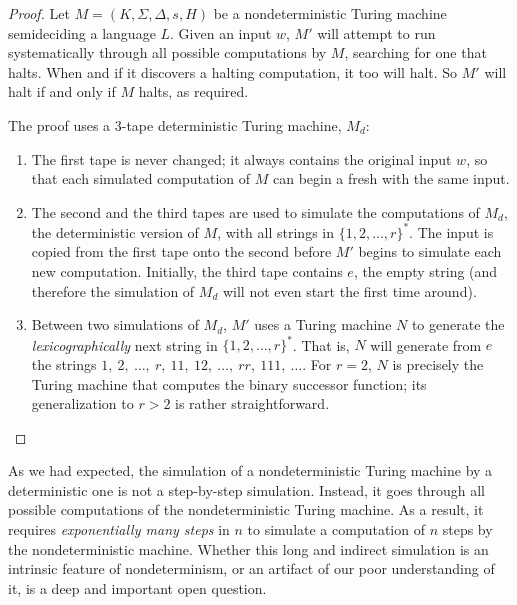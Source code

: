 \begin{proof}
Let $M = (K, \Sigma, \Delta, s, H)$ be a nondeterministic Turing machine semideciding a language $L$. Given an input $w$, $M'$ will attempt to run systematically through all possible computations by $M$, searching for one that halts. When and if it discovers a halting computation, it too will halt. So $M'$ will halt if and only if $M$ halts, as required.

The proof uses a 3-tape deterministic Turing machine, $M_d$:
\begin{enumerate}
  \item The first tape is never changed; it always contains the original input $w$, so that each simulated computation of $M$ can begin a fresh with the same input.
  \item The second and the third tapes are used to simulate the computations of $M_d$, the deterministic version of $M$, with all strings in $\{ 1, 2, \ldots, r \}^*$. The input is copied from the first tape onto the second before $M'$ begins to simulate each new computation. Initially, the third tape contains $e$, the empty string (and therefore the simulation of $M_d$ will not even start the first time around).
  \item Between two simulations of $M_d$, $M'$ uses a Turing machine $N$ to generate the \textit{lexicographically} next string in $\{ 1, 2, \ldots, r \}^*$. That is, $N$ will generate from $e$ the strings $1,\ 2,\ \ldots,\ r,\ 11,\ 12,\ \ldots,\ rr,\ 111,\ \ldots$. For $r = 2$, $N$ is precisely the Turing machine that computes the binary successor function; its generalization to $r > 2$ is rather straightforward. 
\end{enumerate}
\end{proof}

As we had expected, the simulation of a nondeterministic Turing machine by a deterministic one is not a step-by-step simulation. Instead, it goes through all possible computations of the nondeterministic Turing machine. As a result, it requires \textit{exponentially many steps} in $n$ to simulate a computation of $n$ steps by the nondeterministic machine. Whether this long and indirect simulation is an intrinsic feature of nondeterminism, or an artifact of our poor understanding of it, is a deep and important open question.

\vspace*{\fill}
\columnbreak
